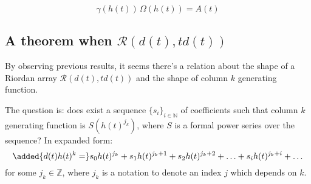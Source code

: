 \documentclass[11pt,a4paper]{article} %
\begin{document}
    \begin{displaymath}
        \gamma(h(t))\,\Omega(h(t)) = A(t) 
    \end{displaymath}

    \subsection{A theorem when $\mathcal{R}(d(t), td(t))$}

    By observing previous results, it seems there's a relation
    about the shape of a Riordan array $\mathcal{R}(d(t), td(t))$ 
    and the shape of column $k$ generating function. 
    
    The question is: does exist a sequence $\lbrace s_i \rbrace_{i \in \mathbb{N}}$ 
    of coefficients such that column $k$ generating function is $S(h(t)^{j_k})$, where $S$
    is a formal power series over the sequence? In expanded form: 
    \begin{displaymath}
        \added{d(t)h(t)^k = }s_0h(t)^{j_k} + s_1 h(t)^{j_k+1} + s_2 h(t)^{j_k+2} + 
            \ldots + s_i h(t)^{j_k+i} + \ldots
    \end{displaymath}
    for some $j_k \in \mathbb{Z}$, where $j_k$ is a notation to denote an index $j$ 
    which depends on $k$.
\end{document}

